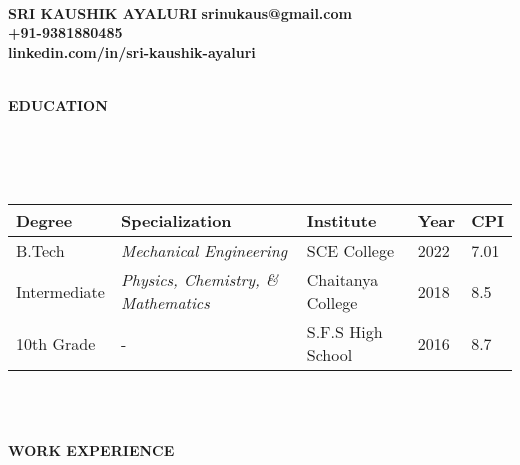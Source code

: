\documentclass[a4paper,10pt]{article}
\newcommand{\lsep}{-0.5cm}
\newcommand{\resheading}[1]{%
  \par\noindent%
  \small%
  \colorbox{mygrey}{%
    \parbox{\dimexpr\linewidth-2\fboxsep\relax}{%
      \textbf{#1}%
    }%
  }%
  \par\nobreak%
}
\begin{document}
\hspace{0.5cm}\\[-1.8cm]

\textbf{SRI KAUSHIK AYALURI} \hspace{9.6cm} {\bf srinukaus@gmail.com}\\
  \hspace{10.3 cm} {\bf +91-9381880485} \\
  \hspace{7.9 cm} {\bf linkedin.com/in/sri-kaushik-ayaluri} \\
 \\


\vspace{-2mm}
\resheading{\textbf{EDUCATION} }\\[\lsep]\\ \\
\indent \begin{tabular}{ p{2.5cm} @{\hskip 0.15in} p{5.5cm} @{\hskip 0.15in} p{3.5cm} @{\hskip 0.15in} p{2.5cm} @{\hskip 0.15in} p{1.5cm} }
\toprule
\textbf{Degree} & \textbf{Specialization} & \textbf{Institute} & \textbf{Year} & \textbf{CPI} \\
\midrule
B.Tech & \textit{Mechanical Engineering} & SCE College & 2022 & 7.01 \\
Intermediate & \textit{Physics, Chemistry, \& Mathematics} & Chaitanya College & 2018 & 8.5 \\
10th Grade & - & S.F.S High School & 2016 & 8.7 \\
\bottomrule
\end{tabular}

\\ \\


\vspace{1mm}

\resheading{\textbf{WORK EXPERIENCE} }
\end{document}
